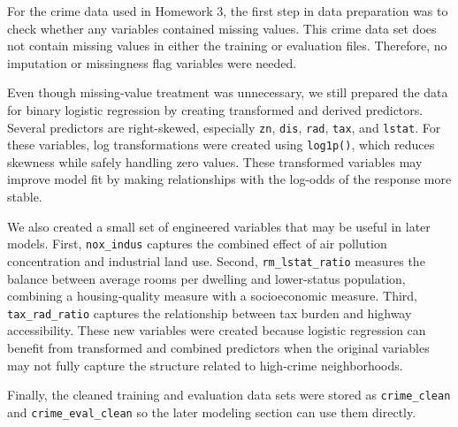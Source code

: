 \documentclass[
  11pt]{article}
\begin{document}
For the crime data used in Homework 3, the first step in data
preparation was to check whether any variables contained missing values.
This crime data set does not contain missing values in either the
training or evaluation files. Therefore, no imputation or missingness
flag variables were needed.

Even though missing-value treatment was unnecessary, we still prepared
the data for binary logistic regression by creating transformed and
derived predictors. Several predictors are right-skewed, especially
\texttt{zn}, \texttt{dis}, \texttt{rad}, \texttt{tax}, and
\texttt{lstat}. For these variables, log transformations were created
using \texttt{log1p()}, which reduces skewness while safely handling
zero values. These transformed variables may improve model fit by making
relationships with the log-odds of the response more stable.

We also created a small set of engineered variables that may be useful
in later models. First, \texttt{nox\_indus} captures the combined effect
of air pollution concentration and industrial land use. Second,
\texttt{rm\_lstat\_ratio} measures the balance between average rooms per
dwelling and lower-status population, combining a housing-quality
measure with a socioeconomic measure. Third, \texttt{tax\_rad\_ratio}
captures the relationship between tax burden and highway accessibility.
These new variables were created because logistic regression can benefit
from transformed and combined predictors when the original variables may
not fully capture the structure related to high-crime neighborhoods.

Finally, the cleaned training and evaluation data sets were stored as
\texttt{crime\_clean} and \texttt{crime\_eval\_clean} so the later
modeling section can use them directly.
\end{document}
